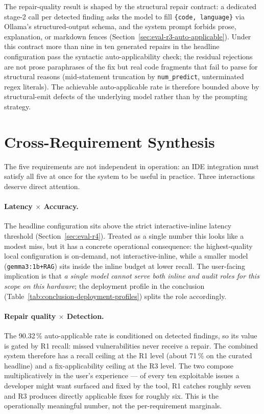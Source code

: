 The repair-quality result is shaped by the structural repair contract: a dedicated stage-2 call per detected finding asks the model to fill \texttt{\{code, language\}} via Ollama's structured-output schema, and the system prompt forbids prose, explanation, or markdown fences (Section~\ref{sec:eval-r3-auto-applicable}). Under this contract more than nine in ten generated repairs in the headline configuration pass the syntactic auto-applicability check; the residual rejections are not prose paraphrases of the fix but real code fragments that fail to parse for structural reasons (mid-statement truncation by \texttt{num\_predict}, unterminated regex literals). The achievable auto-applicable rate is therefore bounded above by structural-emit defects of the underlying model rather than by the prompting strategy.

\section{Cross-Requirement Synthesis}
\label{sec:disc-cross-requirement}

The five requirements are not independent in operation: an IDE integration must satisfy all five at once for the system to be useful in practice. Three interactions deserve direct attention.

\paragraph{Latency $\times$ Accuracy.}
The headline configuration sits above the strict interactive-inline latency threshold (Section~\ref{sec:eval-r4}). Treated as a single number this looks like a modest miss, but it has a concrete operational consequence: the highest-quality local configuration is on-demand, not interactive-inline, while a smaller model (\texttt{gemma3:1b+RAG}) sits inside the inline budget at lower recall. The user-facing implication is that \emph{a single model cannot serve both inline and audit roles for this scope on this hardware}; the deployment profile in the conclusion (Table~\ref{tab:conclusion-deployment-profiles}) splits the role accordingly.

\paragraph{Repair quality $\times$ Detection.}
The 90.32\,\% auto-applicable rate is conditioned on detected findings, so its value is gated by R1 recall: missed vulnerabilities never receive a repair. The combined system therefore has a recall ceiling at the R1 level (about 71\,\% on the curated headline) and a fix-applicability ceiling at the R3 level. The two compose multiplicatively in the user's experience --- of every ten exploitable issues a developer might want surfaced and fixed by the tool, R1 catches roughly seven and R3 produces directly applicable fixes for roughly six. This is the operationally meaningful number, not the per-requirement marginals.

